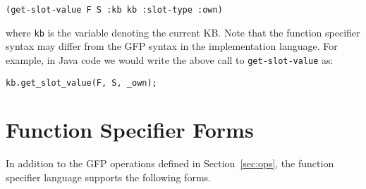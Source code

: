 {\tt (get-slot-value F S :kb kb :slot-type :own)}

where {\tt kb} is the variable denoting the current KB.  Note that the
function specifier syntax may differ from the GFP syntax in the
implementation language.  For example, in Java code we would write the
above call to {\tt get-slot-value} as:

{\tt kb.get\_slot\_value(F, S, \_own);}

\section{Function Specifier Forms}

In addition to the GFP operations defined in Section~\ref{sec:ops},
the function specifier language supports the following forms.



         

